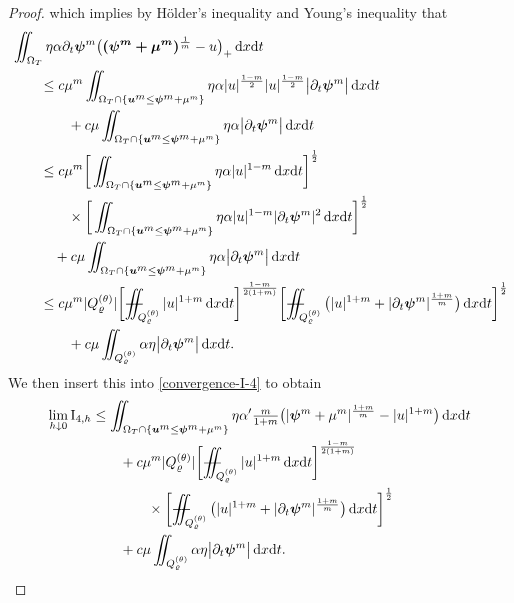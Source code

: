 \documentclass[a4paper, 10pt, american]{amsart}
\numberwithin{theorem}{section}
\numberwithin{equation}{section}
\newcommand{\dxdt}{\,\mathrm{d}x\mathrm{d}t}
\renewcommand{\rho}{\varrho}
\newcommand{\power}[2]{\bm{#1^{\mbox{\unboldmath{\scriptsize$#2$}}}}}
\def\Xiint#1{\mathchoice
    {\XXiint\displaystyle\textstyle{#1}}%
    {\XXiint\textstyle\scriptstyle{#1}}%
    {\XXiint\scriptstyle\scriptscriptstyle{#1}}%
    {\XXiint\scriptscriptstyle\scriptscriptstyle{#1}}%
    \!\iint}
\def\XXiint#1#2#3{\setbox0=\hbox{$#1{#2#3}{\iint}$}
    \vcenter{\hbox{$#2#3$}}\kern-0.5\wd0}
\def\biint{\Xiint{-\!-}}
\begin{document}
\begin{proof}
which implies by H\"older's inequality and Young's inequality that
\begin{align*}
	&\iint_{\Omega_T} \eta\alpha \partial_t \power \psi m  \big(\power{(\psi^m+\mu^m)}{\frac1m}
  -u \big)_+\dxdt \\\nonumber
	&\quad\quad\le
	c\mu^m\iint_{\Omega_T\cap\{\power um \le \power \psi m + \mu^m\}} \eta\alpha |u|^{\frac{1-m}2}|u|^{\frac{1-m}2}\big| \partial_t \power \psi m\big| \dxdt \\\nonumber
	&\quad\quad\quad\quad+
	c\mu\iint_{\Omega_T\cap\{\power um \le \power \psi m + \mu^m\}} \eta\alpha \big|\partial_t \power \psi m\big| \dxdt\\\nonumber
	&\quad\quad\le
	c\mu^m \bigg[\iint_{\Omega_T\cap\{\power um \le \power \psi m + \mu^m\}}\eta\alpha |u|^{1-m} \dxdt \bigg]^{\frac12}\\\nonumber
	&\quad\quad\quad\quad\times
	\bigg[\iint_{\Omega_T\cap\{\power um \le \power \psi m + \mu^m\}}\eta\alpha |u|^{1-m} |\partial_t \power \psi {m}|^{2} \dxdt\bigg]^{\frac{1}{2}} \\\nonumber
	&\quad\quad\quad+
	c\mu\iint_{\Omega_T\cap\{\power um \le \power \psi m + \mu^m\}} \eta\alpha \big|\partial_t \power \psi m\big| \dxdt\\\nonumber
	&\quad\quad\le
	c\mu^m|Q_\rho^{(\theta)}| \bigg[\biint_{Q_\rho^{(\theta)}} |u|^{1+m} \dxdt \bigg]^{\frac{1-m}{2(1+m)}}
	\bigg[\biint_{Q_\rho^{(\theta)}} \big( |u|^{1+m} + |\partial_t \power \psi {m}|^{\frac{1+m}m}\big) \dxdt\bigg]^{\frac{1}{2}} \\\nonumber
	&\quad\quad\quad\quad+
	c\mu\iint_{Q_\rho^{(\theta)}}\alpha\eta \big|\partial_t \power \psi m\big| \dxdt.
\end{align*}
We then insert this into \eqref{convergence-I-4} to obtain
\begin{align}\label{convergence-I-4-1}
 \lim_{h\downarrow0}\mathrm{I}_{4,h}
  &\le
  \iint_{\Omega_T\cap\{\power um \le \power \psi m + \mu^m\}}\eta\alpha' \tfrac m{1+m} \big(|\power\psi m+\mu^m|^{\frac{1+m}m}-|u|^{1+m}
  \big)\dxdt\\\nonumber
  &\qquad+
  c\mu^m|Q_\rho^{(\theta)}| \bigg[\biint_{Q_\rho^{(\theta)}} |u|^{1+m} \dxdt \bigg]^{\frac{1-m}{2(1+m)}}\\\nonumber
	&\quad\quad\quad\quad\times
	\bigg[\biint_{Q_\rho^{(\theta)}} \big( |u|^{1+m} + |\partial_t \power \psi {m}|^{\frac{1+m}m}\big) \dxdt\bigg]^{\frac{1}{2}} \\\nonumber
	&\quad\quad+
	c\mu\iint_{Q_\rho^{(\theta)}}\alpha\eta\big|\partial_t \power \psi m\big| \dxdt.

\end{align}
\end{proof}
\end{document}
